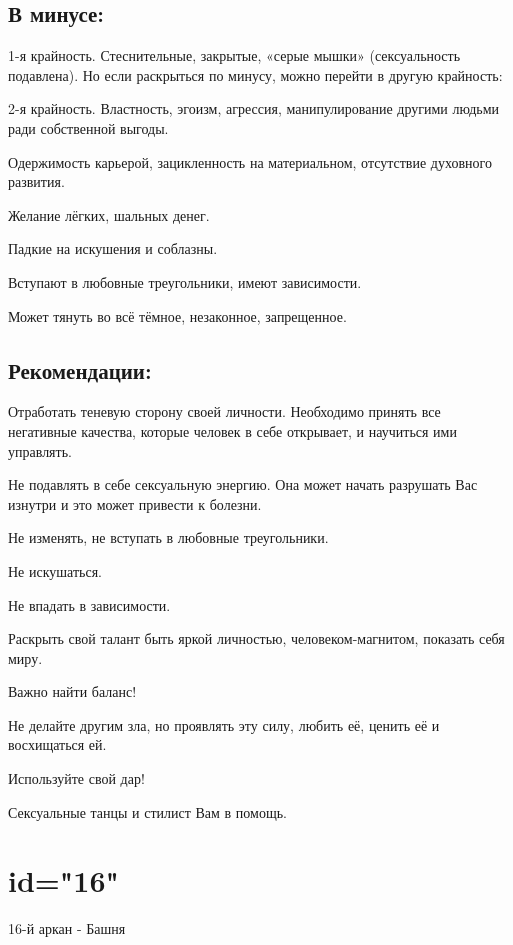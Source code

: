 \subsection{В минусе:}
\item 1-я крайность. Стеснительные, закрытые, «серые мышки» (сексуальность подавлена). Но если раскрыться по минусу, можно перейти в другую крайность:
\item 2-я крайность. Властность, эгоизм, агрессия, манипулирование другими людьми ради собственной выгоды.
\item Одержимость карьерой, зацикленность на материальном, отсутствие духовного развития.
\item Желание лёгких, шальных денег.
\item Падкие на искушения и соблазны.
\item Вступают в любовные треугольники, имеют зависимости.
\item Может тянуть во всё тёмное, незаконное, запрещенное.
\endsubsection

\subsection{Рекомендации:}
\item Отработать теневую сторону своей личности. Необходимо принять все негативные качества, которые человек в себе открывает, и научиться ими управлять.
\item Не подавлять в себе сексуальную энергию. Она может начать разрушать Вас изнутри и это может привести к болезни.
\item Не изменять, не вступать в любовные треугольники.
\item Не искушаться.
\item Не впадать в зависимости.
\item Раскрыть свой талант быть яркой личностью, человеком-магнитом, показать себя миру.
\item Важно найти баланс!
\item Не делайте другим зла, но проявлять эту силу, любить её, ценить её и восхищаться ей.
\item Используйте свой дар!
\item Сексуальные танцы и стилист Вам в помощь.
\endsubsection

\endsection

\section{id="16"}{16-й аркан - Башня}

